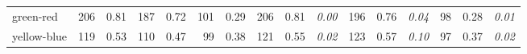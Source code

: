 {\begin{tabular*}{\textwidth}{@{}p{26.5mm}|rl|rl|rl||rll|rll|rll@{}}
    green-red & 206 & 0.81 & 187 & 0.72 & 101 & 0.29
    & 206 & 0.81 & \itshape\textcolor{dark}{0.00}
    & 196 & 0.76 & \itshape\textcolor{dark}{0.04}
    & 98 & 0.28 & \itshape\textcolor{dark}{0.01} \\
    yellow-blue & 119 & 0.53 & 110 & 0.47 & 99 & 0.38
    & 121 & 0.55 & \itshape\textcolor{dark}{0.02}
    & 123 & 0.57 & \itshape\textcolor{dark}{0.10}
    & 97 & 0.37 & \itshape\textcolor{dark}{0.02} \\
    \hline
  \end{tabular*}
  \vspace{3mm}
  
}


